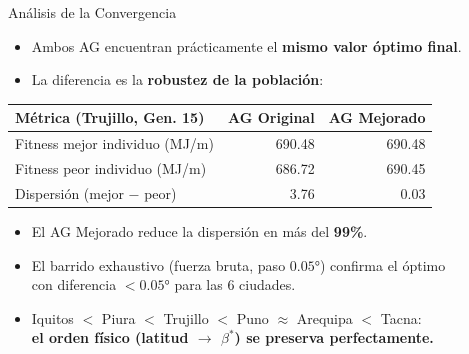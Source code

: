 \documentclass[10pt]{beamer}
\begin{document}
\begin{frame}{Análisis de la Convergencia}
  \begin{itemize}
    \item Ambos AG encuentran prácticamente el \textbf{mismo valor óptimo final}.
    \item La diferencia es la \textbf{robustez de la población}:
  \end{itemize}

  \vspace{0.3cm}

  \begin{table}
    \centering
    \small
    \begin{tabular}{lrr}
      \toprule
      \textbf{Métrica (Trujillo, Gen. 15)} & \textbf{AG Original} & \textbf{AG Mejorado} \\
      \midrule
      Fitness mejor individuo (MJ/m) & 690.48 & 690.48 \\
      Fitness peor individuo (MJ/m)  & 686.72 & 690.45 \\
      Dispersión (mejor $-$ peor)    & 3.76   & 0.03   \\
      \bottomrule
    \end{tabular}
  \end{table}

  \vspace{0.3cm}
  \begin{itemize}
    \item El AG Mejorado reduce la dispersión en más del \textbf{99\%}.
    \item El barrido exhaustivo (fuerza bruta, paso $0.05°$) confirma el óptimo\\
          con diferencia $< 0.05°$ para las 6 ciudades.
    \item Iquitos $<$ Piura $<$ Trujillo $<$ Puno $\approx$ Arequipa $<$ Tacna:\\
          \textbf{el orden físico (latitud $\to$ $\beta^*$) se preserva perfectamente.}
  \end{itemize}
\end{frame}

\end{document}
